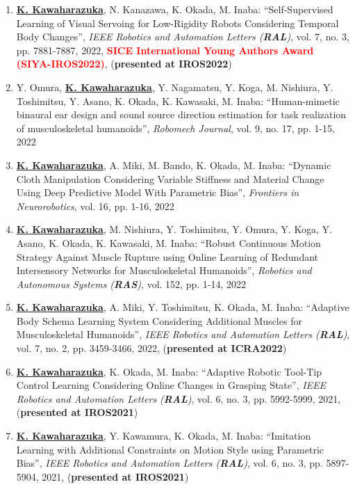 \documentclass[letterpaper,11pt]{article}
\begin{document}
\begin{enumerate}
\item \underline{\textbf{K. Kawaharazuka}}, N. Kanazawa, K. Okada, M. Inaba: ``Self-Supervised Learning of Visual Servoing for Low-Rigidity Robots Considering Temporal Body Changes'', \textit{IEEE Robotics and Automation Letters (\textit{\textbf{RAL}})}, vol. 7, no. 3, pp. 7881-7887, 2022, \textbf{\textcolor{red}{SICE International Young Authors Award (SIYA-IROS2022)}}, (\textbf{presented at IROS2022})
\item Y. Omura, \underline{\textbf{K. Kawaharazuka}}, Y. Nagamatsu, Y. Koga, M. Nishiura, Y. Toshimitsu, Y. Asano, K. Okada, K. Kawasaki, M. Inaba: ``Human-mimetic binaural ear design and sound source direction estimation for task realization of musculoskeletal humanoids'', \textit{Robomech Journal}, vol. 9, no. 17, pp. 1-15, 2022
\item \underline{\textbf{K. Kawaharazuka}}, A. Miki, M. Bando, K. Okada, M. Inaba: ``Dynamic Cloth Manipulation Considering Variable Stiffness and Material Change Using Deep Predictive Model With Parametric Bias'', \textit{Frontiers in Neurorobotics}, vol. 16, pp. 1-16, 2022
\item \underline{\textbf{K. Kawaharazuka}}, M. Nishiura, Y. Toshimitsu, Y. Omura, Y. Koga, Y. Asano, K. Okada, K. Kawasaki, M. Inaba: ``Robust Continuous Motion Strategy Against Muscle Rupture using Online Learning of Redundant Intersensory Networks for Musculoskeletal Humanoids'', \textit{Robotics and Autonomous Systems (\textit{\textbf{RAS}})}, vol. 152, pp. 1-14, 2022
\item \underline{\textbf{K. Kawaharazuka}}, A. Miki, Y. Toshimitsu, K. Okada, M. Inaba: ``Adaptive Body Schema Learning System Considering Additional Muscles for Musculoskeletal Humanoids'', \textit{IEEE Robotics and Automation Letters (\textit{\textbf{RAL}})}, vol. 7, no. 2, pp. 3459-3466, 2022, (\textbf{presented at ICRA2022})
\item \underline{\textbf{K. Kawaharazuka}}, K. Okada, M. Inaba: ``Adaptive Robotic Tool-Tip Control Learning Considering Online Changes in Grasping State'', \textit{IEEE Robotics and Automation Letters (\textit{\textbf{RAL}})}, vol. 6, no. 3, pp. 5992-5999, 2021, (\textbf{presented at IROS2021})
\item \underline{\textbf{K. Kawaharazuka}}, Y. Kawamura, K. Okada, M. Inaba: ``Imitation Learning with Additional Constraints on Motion Style using Parametric Bias'', \textit{IEEE Robotics and Automation Letters (\textit{\textbf{RAL}})}, vol. 6, no. 3, pp. 5897-5904, 2021, (\textbf{presented at IROS2021})

\end{enumerate}
\end{document}

